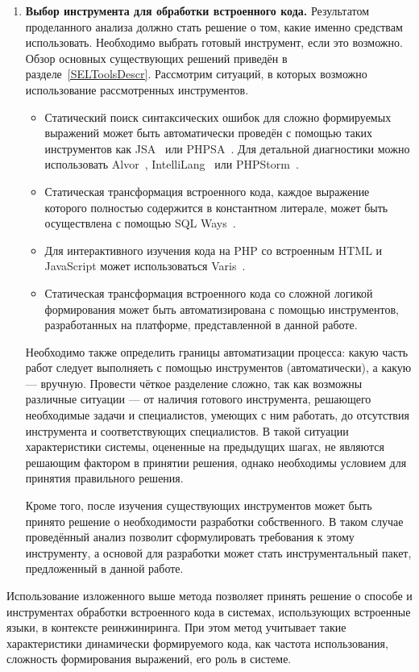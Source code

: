 \begin{enumerate}
  \item \textbf{Выбор инструмента для обработки встроенного кода.} Результатом проделанного анализа должно стать решение о том, какие именно средствам использовать. Необходимо выбрать готовый инструмент, если это возможно. Обзор основных существующих решений  приведён в разделе~\ref{SELToolsDescr}. Рассмотрим ситуаций, в которых возможно использование рассмотренных инструментов.
  \begin{itemize}
    \item Статический поиск синтаксических ошибок для сложно формируемых выражений может быть автоматически проведён с помощью таких инструментов как JSA~\cite{JSAUrl} или PHPSA~\cite{PHPSAUrl}. Для детальной диагностики можно использовать Alvor~\cite{AlvorUrl}, IntelliLang~\cite{IntelliLang} или PHPStorm~\cite{PHPStorm}.
    \item Статическая трансформация встроенного кода, каждое выражение которого полностью содержится в константном литерале, может быть осуществлена с помощью SQL Ways~\cite{SQLWays}.
    \item Для интерактивного изучения кода на PHP со встроенным HTML и JavaScript может использоваться Varis~\cite{Varis}.
    \item Статическая трансформация встроенного кода со сложной логикой формирования может быть автоматизирована с помощью инструментов, разработанных на платформе, представленной в данной работе.
  \end{itemize}
  
  Необходимо также определить границы автоматизации процесса: какую часть работ следует выполняеть с помощью инструментов (автоматически), а какую --- вручную. Провести чёткое разделение сложно, так как возможны различные ситуации --- от наличия готового инструмента, решающего необходимые задачи и специалистов, умеющих с ним работать, до отсутствия инструмента и соответствующих специалистов. В такой ситуации характеристики системы, оцененные на предыдущих шагах, не являются решающим фактором в принятии решения, однако необходимы условием для принятия правильного решения.
  
  Кроме того, после изучения существующих инструментов может быть  принято решение о необходимости разработки собственного. В таком случае проведённый анализ позволит сформулировать требования к этому инструменту, а основой для разработки может стать инструментальный пакет, предложенный в данной работе.
  
\end{enumerate}

Использование изложенного выше метода позволяет принять решение о способе и инструментах обработки встроенного кода в системах, использующих встроенные языки, в контексте реинжиниринга. При этом метод учитывает такие характеристики динамически формируемого кода, как частота использования, сложность формирования выражений, его роль в системе.


\clearpage
